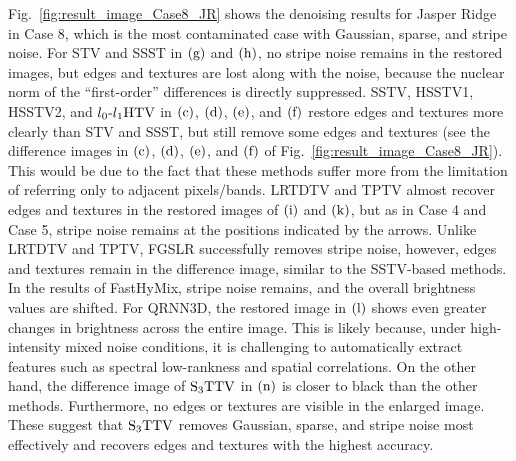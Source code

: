 Fig.~\ref{fig:result_image_Case8_JR} shows the denoising results for Jasper Ridge in Case 8, which is the most contaminated case with Gaussian, sparse, and stripe noise. 
For STV and SSST in $\text{(g)}$ and $\text{(h)}$, no stripe noise remains in the restored images, but edges and textures are lost along with the noise, because the nuclear norm of the ``first-order'' differences is directly suppressed. SSTV, HSSTV1, HSSTV2, and ${l_{0}\text{-}l_{1}\text{HTV}}$ in $\text{(c)}$, $\text{(d)}$, $\text{(e)}$, and $\text{(f)}$ restore edges and textures more clearly than STV and SSST, but still remove some edges and textures (see the difference images in $\text{(c)}$, $\text{(d)}$, $\text{(e)}$, and $\text{(f)}$ of Fig.~\ref{fig:result_image_Case8_JR}). This would be due to the fact that these methods suffer more from the limitation of referring only to adjacent pixels/bands. LRTDTV and TPTV almost recover edges and textures in the restored images of $\text{(i)}$ and $\text{(k)}$, but as in Case 4 and Case 5, stripe noise remains at the positions indicated by the arrows. Unlike LRTDTV and TPTV, FGSLR successfully removes stripe noise, however, edges and textures remain in the difference image, similar to the SSTV-based methods. In the results of FastHyMix, stripe noise remains, and the overall brightness values are shifted. For QRNN3D, the restored image in $\text{(l)}$ shows even greater changes in brightness across the entire image. This is likely because, under high-intensity mixed noise conditions, it is challenging to automatically extract features such as spectral low-rankness and spatial correlations. On the other hand, the difference image of ${\text{S}_{3} \text{TTV}}$ in $\text{(n)}$ is closer to black than the other methods. Furthermore, no edges or textures are visible in the enlarged image. These suggest that ${\text{S}_{3} \text{TTV}}$ removes Gaussian, sparse, and stripe noise most effectively and recovers edges and textures with the highest accuracy.



